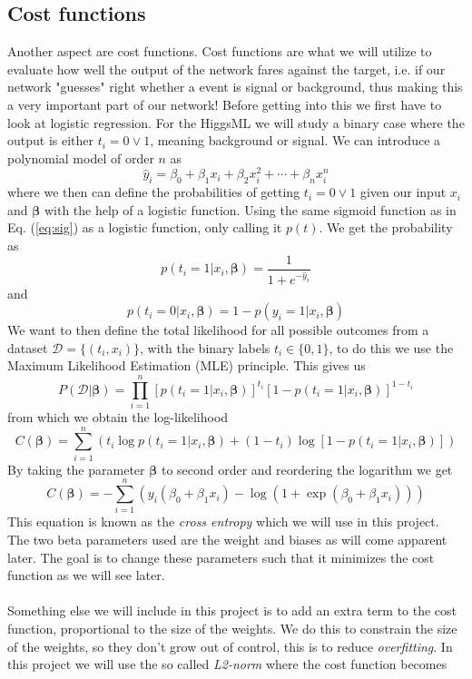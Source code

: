 \documentclass[14pt, a4paper]{book}
\begin{document}
\subsection{Cost functions}
Another aspect are cost functions. Cost functions are what we will utilize to evaluate how well the output of the network fares against the target, i.e. if our network "guesses" right whether a event is signal or background, thus making this a very important part of our network! Before getting into this we first have to look at logistic regression. For the HiggsML we will study a binary case where the output is either $t_i=0\vee 1$, meaning background or signal. We can introduce a polynomial model of order $n$ as
$$
\hat{y}_i=\beta_0+\beta_1x_i+\beta_2x_i^2+\cdots+\beta_nx_i^n
$$
where we then can define the probabilities of getting $t_i=0\vee1$ given our input $x_i$ and $\bm{\beta}$ with the help of a logistic function. Using the same sigmoid function as in Eq. (\ref{eq:sig}) as a logistic function, only calling it $p(t)$. We get the probability as
$$
p(t_i=1\vert x_i,\bm{\beta})=\frac{1}{1+e^{-\hat{y}_i}}
$$
and
$$
p(t_i=0\vert x_i,\bm{\beta})=1- p(y_i=1\vert x_i,\bm{\beta})
$$
We want to then define the total likelihood for all possible outcomes from a dataset $\mathcal{D}=\{(t_i,x_i)\}$, with the binary labels $t_i\in\{0,1\}$, to do this we use the Maximum Likelihood Estimation (MLE) principle. This gives us
$$
P(\mathcal{D}\vert\bm{\beta})=\prod_{i=1}^n\left[p(t_i=1\vert x_i,\bm{\beta})\right]^{t_i}\left[1-p(t_i=1\vert x_i,\bm{\beta})\right]^{1-t_i}
$$
from which we obtain the log-likelihood
$$
C(\bm{\beta})=\sum_{i=1}^n\left(t_i\log p(t_i=1\vert x_i,\bm{\beta})+(1-t_i)\log[1-p(t_i=1\vert x_i,\bm{\beta})]\right)
$$
By taking the parameter $\bm{\beta}$ to second order and reordering the logarithm we get
\begin{equation}\label{eq:CrossEntropy}
    C(\bm{\beta})=-\sum_{i=1}^n(y_i(\beta_0+\beta_1x_i)-\log(1+\exp(\beta_0+\beta_1x_i)))
\end{equation}
This equation is known as the \textit{cross entropy} which we will use in this project. The two beta parameters used are the weight and biases as will come apparent later.
The goal is to change these parameters such that it minimizes the cost function as we will see later. \\
\\Something else we will include in this project is to add an extra term to the cost function, proportional to the size of the weights. We do this to constrain the size of the weights, so they don't grow out of control, this is to reduce \textit{overfitting}. In this project we will use the so called \textit{L2-norm} where the cost function becomes
\end{document}
